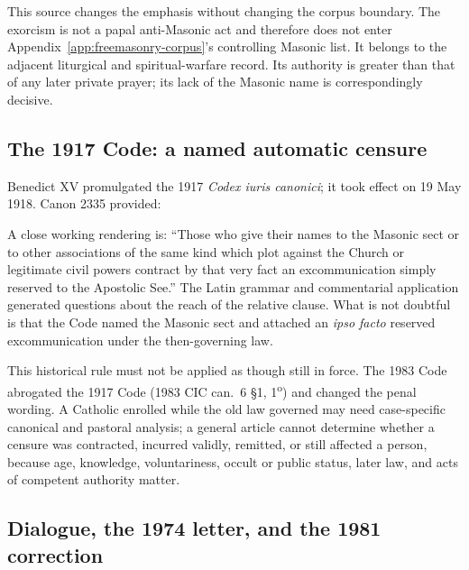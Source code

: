 This source changes the emphasis without changing the corpus boundary. The exorcism is not a papal anti-Masonic act and therefore does not enter Appendix~\ref{app:freemasonry-corpus}'s controlling Masonic list. It belongs to the adjacent liturgical and spiritual-warfare record. Its authority is greater than that of any later private prayer; its lack of the Masonic name is correspondingly decisive.

\subsection{The 1917 Code: a named automatic censure}

Benedict XV promulgated the 1917 \emph{Codex iuris canonici}; it took effect on 19 May 1918. Canon 2335 provided:

\begin{quote}
\end{quote}

A close working rendering is: “Those who give their names to the Masonic sect or to other associations of the same kind which plot against the Church or legitimate civil powers contract by that very fact an excommunication simply reserved to the Apostolic See.” The Latin grammar and commentarial application generated questions about the reach of the relative clause. What is not doubtful is that the Code named the Masonic sect and attached an \emph{ipso facto} reserved excommunication under the then-governing law.

This historical rule must not be applied as though still in force. The 1983 Code abrogated the 1917 Code (1983 CIC can.~6 \S1, 1\textsuperscript{o}) and changed the penal wording. A Catholic enrolled while the old law governed may need case-specific canonical and pastoral analysis; a general article cannot determine whether a censure was contracted, incurred validly, remitted, or still affected a person, because age, knowledge, voluntariness, occult or public status, later law, and acts of competent authority matter.

\subsection{Dialogue, the 1974 letter, and the 1981 correction}

